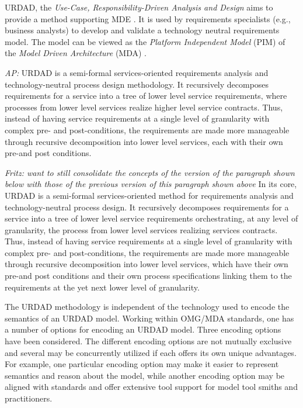 URDAD, the {\em Use-Case, Responsibility-Driven Analysis and Design} \cite{fritz_solms_technology_2007} aims to provide a method supporting MDE \cite{solms_urdad_2010}. It is used by requirements specialists (e.g., business analysts) to develop and validate a technology neutral requirements model. The model can be viewed as the {\em Platform Independent Model} (PIM) of the {\em Model Driven Architecture} (MDA) \cite{solms_urdad_2010}.

\emph{AP:}
URDAD is a semi-formal services-oriented requirements analysis and technology-neutral process design methodology. It recursively decomposes requirements for a service into a tree of lower level service requirements, where processes from lower level services realize higher level service contracts. Thus, instead of having service requirements at a single level of granularity with complex pre- and post-conditions, the requirements are made more manageable through recursive decomposition into lower level services, each with their own pre-and post conditions.

\emph{Fritz: want to still consolidate the concepts of the version of the paragraph shown below with those of the previous version of this paragraph shown above}
In its core, URDAD is a semi-formal services-oriented method for requirements analysis and technology-neutral process design. It recursively decomposes requirements for a service into a tree of lower level service requirements orchestrating, at any level of granularity, the process from lower level services realizing services contracts. Thus, instead of having service requirements at a single level of granularity with complex pre- and post-conditions, the requirements are made more manageable through recursive decomposition into lower level services, which have their own pre-and post conditions and their own process specifications linking them to the requirements at the yet next lower level of granularity.

The URDAD methodology is independent of the technology used to encode the semantics of an URDAD model. Working within OMG/MDA standards, one has a number of options for encoding an URDAD model. Three encoding options have been considered. The different encoding options are not mutually exclusive and several may be concurrently utilized if each offers its own unique advantages. For example, one particular encoding option may make it easier to represent semantics and reason about the model, while another encoding option may be aligned with standards and offer extensive tool support for model tool smiths and practitioners. 

